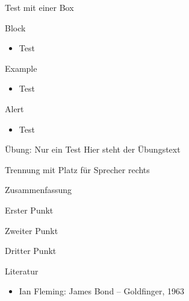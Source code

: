 \documentclass[aspectratio=169]{beamer}
\begin{document}

\begin{contentsframe}{Test mit einer Box}
  \begin{block}{Block}
    \begin{itemize}
      \item Test
  \end{itemize}
  \end{block}
  \begin{exampleblock}{Example}
    \begin{itemize}
      \item Test
  \end{itemize}
  \end{exampleblock}
  \begin{alertblock}{Alert}
    \begin{itemize}
      \item Test
  \end{itemize}
  \end{alertblock}
\end{contentsframe}

\begin{exercise}{Übung: Nur ein Test}
  Hier steht der Übungstext
\end{exercise}

\begin{speakersectionframe}{Trennung mit Platz für Sprecher rechts}
\end{speakersectionframe}

\begin{itemframe}{Zusammenfassung}
    \item Erster Punkt
    \item Zweiter Punkt
    \item Dritter Punkt
\end{itemframe}

\begin{literature}{Literatur}
\begin{itemize}
\item Ian Fleming: James Bond -- Goldfinger, 1963
\end{itemize}
\end{literature}
\end{document}
